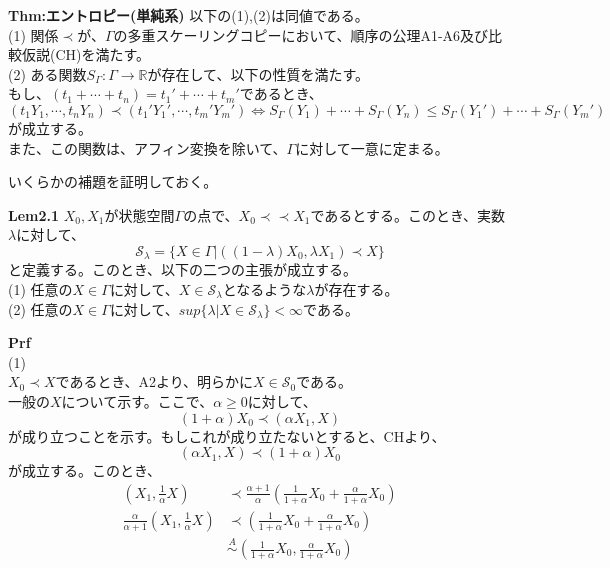 \documentclass[a4paper,11pt]{jsarticle}
\begin{document}
\begin{itembox}[l]{\textbf{Thm:エントロピー(単純系)}}
    以下の(1),(2)は同値である。\\
    (1) 関係$\prec$が、$\Gamma$の多重スケーリングコピーにおいて、順序の公理A1-A6及び比較仮説(CH)を満たす。\\
    (2) ある関数$S_{\Gamma}:\Gamma \rightarrow \mathbb{R}$が存在して、以下の性質を満たす。\\
    もし、$(t_1+ \cdots +t_n)=t_1'+ \cdots +t_m'$であるとき、
    \begin{equation}
        (t_1 Y_1, \cdots ,t_n Y_n) \prec (t_1' Y_1', \cdots ,t_m' Y_m') \Leftrightarrow S_{\Gamma}(Y_1)+ \cdots +S_{\Gamma}(Y_n) \leq S_{\Gamma}(Y_1')+ \cdots +S_{\Gamma}(Y_m')
    \end{equation}
    が成立する。\\
    また、この関数は、アフィン変換を除いて、$\Gamma$に対して一意に定まる。

\end{itembox}
いくらかの補題を証明しておく。\\
\begin{itembox}[l]{\textbf{Lem2.1}}
$X_0,X_1$が状態空間$\Gamma$の点で、$X_0 \prec \prec X_1$であるとする。このとき、実数$\lambda$に対して、
\begin{equation}
    \mathcal{S}_{\lambda} = \{X\in \Gamma|((1-\lambda)X_0,\lambda X_1) \prec X \}
\end{equation}
と定義する。このとき、以下の二つの主張が成立する。\\
(1) 任意の$X \in \Gamma$に対して、$X \in \mathcal{S}_{\lambda}$となるような$\lambda$が存在する。\\
(2) 任意の$X \in \Gamma$に対して、$sup\{\lambda|X \in \mathcal{S}_{\lambda}\}<\infty$である。

\end{itembox}
\textbf{Prf}\\
(1) \\
$X_0 \prec X$であるとき、A2より、明らかに$X \in \mathcal{S}_0$である。\\
一般の$X$について示す。ここで、$\alpha \geq 0$に対して、
\begin{equation}
    (1+\alpha)X_0 \prec (\alpha X_1,X)
\end{equation}
が成り立つことを示す。もしこれが成り立たないとすると、CHより、
\begin{equation}
    (\alpha X_1,X) \prec (1+\alpha)X_0
\end{equation}
が成立する。このとき、
\begin{align}
    (X_1,\frac{1}{\alpha}X) &\prec \frac{\alpha+1}{\alpha}(\frac{1}{1+\alpha}X_0+\frac{\alpha}{1+\alpha}X_0)\\
    \frac{\alpha}{\alpha+1}(X_1,\frac{1}{\alpha}X) &\prec (\frac{1}{1+\alpha}X_0+\frac{\alpha}{1+\alpha}X_0)\\
    &\overset{A}{\sim} (\frac{1}{1+\alpha}X_0,\frac{\alpha}{1+\alpha}X_0)\\
\end{align}
\end{document}
